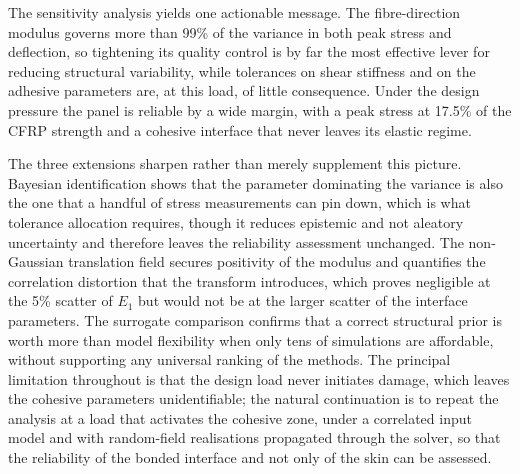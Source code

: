 \documentclass[review,3p,times,12pt,nopreprintline]{elsarticle}
\begin{document}
The sensitivity analysis yields one actionable message. The fibre-direction modulus governs
more than 99\% of the variance in both peak stress and deflection, so tightening its quality
control is by far the most effective lever for reducing structural variability, while
tolerances on shear stiffness and on the adhesive parameters are, at this load, of little
consequence. Under the design pressure the panel is reliable by a wide margin, with a peak
stress at 17.5\% of the CFRP strength and a cohesive interface that never leaves its elastic
regime.

The three extensions sharpen rather than merely supplement this picture. Bayesian
identification shows that the parameter dominating the variance is also the one that a
handful of stress measurements can pin down, which is what tolerance allocation requires,
though it reduces epistemic and not aleatory uncertainty and therefore leaves the
reliability assessment unchanged. The non-Gaussian translation field secures positivity of
the modulus and quantifies the correlation distortion that the transform introduces, which
proves negligible at the 5\% scatter of $E_1$ but would not be at the larger scatter of the
interface parameters. The surrogate comparison confirms that a correct structural prior is
worth more than model flexibility when only tens of simulations are affordable, without
supporting any universal ranking of the methods. The principal limitation throughout is that
the design load never initiates damage, which leaves the cohesive parameters unidentifiable;
the natural continuation is to repeat the analysis at a load that activates the cohesive
zone, under a correlated input model and with random-field realisations propagated through
the solver, so that the reliability of the bonded interface and not only of the skin can be
assessed.


\end{document}
